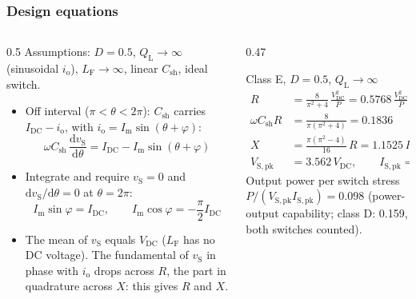 \begin{frame}
	\frametitle{Design equations}
	\begin{columns}[T]
		\begin{column}{0.5\textwidth}
			\footnotesize
			Assumptions: $D=0.5$, $Q_\mathrm{L}\to\infty$ (sinusoidal $i_\mathrm{o}$), $L_\mathrm{F}\to\infty$, linear $C_\mathrm{sh}$, ideal switch.
			\begin{itemize}
				\item Off interval ($\pi<\theta<2\pi$): $C_\mathrm{sh}$ carries $I_\mathrm{DC}-i_\mathrm{o}$, with $i_\mathrm{o}=I_\mathrm{m}\sin(\theta+\varphi)$:
				\begin{equation*}
					\omega C_\mathrm{sh}\,\frac{\mathrm{d}v_\mathrm{S}}{\mathrm{d}\theta}=I_\mathrm{DC}-I_\mathrm{m}\sin(\theta+\varphi)
				\end{equation*}
				\item Integrate and require $v_\mathrm{S}=0$ and $\mathrm{d}v_\mathrm{S}/\mathrm{d}\theta=0$ at $\theta=2\pi$:
				\begin{equation*}
					I_\mathrm{m}\sin\varphi=I_\mathrm{DC},\qquad I_\mathrm{m}\cos\varphi=-\frac{\pi}{2}I_\mathrm{DC}
				\end{equation*}
				\item The mean of $v_\mathrm{S}$ equals $V_\mathrm{DC}$ ($L_\mathrm{F}$ has no DC voltage). The fundamental of $v_\mathrm{S}$ in phase with $i_\mathrm{o}$ drops across $R$, the part in quadrature across $X$: this gives $R$ and $X$.
			\end{itemize}
		\end{column}
		\begin{column}{0.47\textwidth}
			\begin{varblock}[\textwidth]{Class E, $D=0.5$, $Q_\mathrm{L}\to\infty$}
				\footnotesize
				\begin{align*}
					R                       & =\frac{8}{\pi^2+4}\,\frac{V_\mathrm{DC}^2}{P}=0.5768\,\frac{V_\mathrm{DC}^2}{P} \\
					\omega C_\mathrm{sh}R   & =\frac{8}{\pi(\pi^2+4)}=0.1836                                                 \\
					X                       & =\frac{\pi(\pi^2-4)}{16}\,R=1.1525\,R                                          \\
					V_\mathrm{S,pk}         & =3.562\,V_\mathrm{DC},\qquad I_\mathrm{S,pk}=2.862\,I_\mathrm{DC}
				\end{align*}
				Output power per switch stress $P/(V_\mathrm{S,pk}I_\mathrm{S,pk})=0.098$ (power-output capability; class D: 0.159, both switches counted).
			\end{varblock}
		\end{column}
	\end{columns}
\end{frame}

